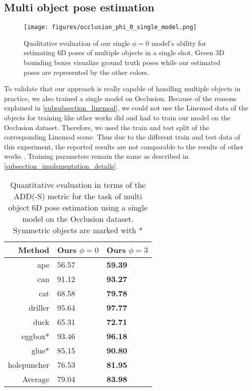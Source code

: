 \documentclass[twocolumn, 10pt, letterpaper]{article}
\begin{document}
\subsection{Multi object pose estimation}
\label{subsection_occlusion_single_model}

\begin{figure}
\texttt{[image: figures/occlusion\_phi\_0\_single\_model.png]}
\caption{Qualitative evaluation of our single $\phi = 0$ model's ability for estimating 6D poses of multiple objects in a single shot. Green 3D bounding boxes visualize ground truth poses while our estimated poses are represented by the other colors.}
\label{figure_merged_occlusion_phi_0_example}
\end{figure}

To validate that our approach is really capable of handling multiple objects in practice, we also trained a single model on Occlusion. Because of the reasons explained in \autoref{subsubsection_linemod}, we could not use the Linemod data of the objects for training like other works did \cite{PVNet}\cite{PoseCNN} and had to train our model on the Occlusion dataset. Therefore, we used the train and test split of the corresponding Linemod scene. Thus due to the different train and test data of this experiment, the reported results are not comparable to the results of other works \cite{PVNet}\cite{PoseCNN}. Training parameters remain the same as described in \autoref{subsection_implementation_details}.
\begin{table}
\begin{tabularx}{\columnwidth}{ | r | X  X |}
 \hline
 Method & \textbf{Ours} $\phi = 0$ & \textbf{Ours} $\phi = 3$  \\
 \hline
 ape            & 56.57 & \textbf{59.39} \\
 can            & 91.12 & \textbf{93.27} \\
 cat            & 68.58 & \textbf{79.78} \\
 driller        & 95.64 & \textbf{97.77} \\
 duck           & 65.31 & \textbf{72.71} \\
 eggbox*        & 93.46 & \textbf{96.18} \\
 glue*          & 85.15 & \textbf{90.80} \\
 holepuncher    & 76.53 & \textbf{81.95} \\
 \hline
 Average & 79.04 & \textbf{83.98} \\
 \hline
\end{tabularx}
\caption{Quantitative evaluation in terms of the ADD(-S) metric for the task of multi object 6D pose estimation using a single model on the Occlusion dataset. Symmetric objects are marked with *}
\label{table_occlusion_single_model_results}
\end{table}
\end{document}

